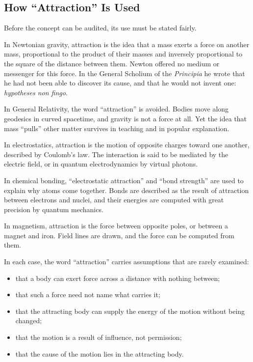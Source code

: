 \documentclass[11pt,a4paper]{article}
\begin{document}
\subsection*{How ``Attraction'' Is Used}

Before the concept can be audited, its use must be stated fairly.

In Newtonian gravity, attraction is the idea that a mass exerts a force on another mass, proportional to the product of their masses and inversely proportional to the square of the distance between them. Newton offered no medium or messenger for this force. In the General Scholium of the \emph{Principia} he wrote that he had not been able to discover its cause, and that he would not invent one: \emph{hypotheses non fingo}.

In General Relativity, the word ``attraction'' is avoided. Bodies move along geodesics in curved spacetime, and gravity is not a force at all. Yet the idea that mass ``pulls'' other matter survives in teaching and in popular explanation.

In electrostatics, attraction is the motion of opposite charges toward one another, described by Coulomb's law. The interaction is said to be mediated by the electric field, or in quantum electrodynamics by virtual photons.

In chemical bonding, ``electrostatic attraction'' and ``bond strength'' are used to explain why atoms come together. Bonds are described as the result of attraction between electrons and nuclei, and their energies are computed with great precision by quantum mechanics.

In magnetism, attraction is the force between opposite poles, or between a magnet and iron. Field lines are drawn, and the force can be computed from them.

In each case, the word ``attraction'' carries assumptions that are rarely examined:
\begin{itemize}
  \item that a body can exert force across a distance with nothing between;
  \item that such a force need not name what carries it;
  \item that the attracting body can supply the energy of the motion without being changed;
  \item that the motion is a result of influence, not permission;
  \item that the cause of the motion lies in the attracting body.
\end{itemize}
\end{document}
